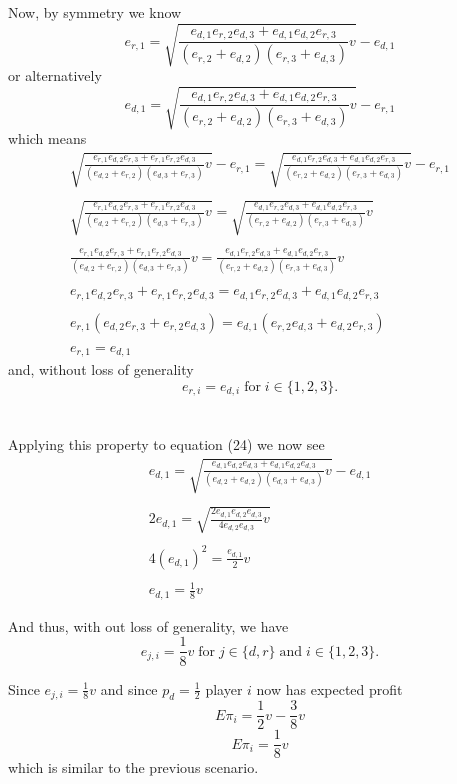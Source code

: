 \documentclass[a4paper,12pt]{article}
\begin{document}
\noindent Now, by symmetry we know
$$
e_{r,1} = \sqrt{\frac{e_{d,1}e_{r,2}e_{d,3} + e_{d,1}e_{d,2}e_{r,3}}{(e_{r,2}+e_{d,2})(e_{r,3}+e_{d,3})} v} - e_{d,1}
$$
or alternatively
$$
e_{d,1} = \sqrt{\frac{e_{d,1}e_{r,2}e_{d,3} + e_{d,1}e_{d,2}e_{r,3}}{(e_{r,2}+e_{d,2})(e_{r,3}+e_{d,3})} v} - e_{r,1}
$$
which means
\begin{gather*}
\sqrt{\frac{e_{r,1}e_{d,2}e_{r,3} + e_{r,1}e_{r,2}e_{d,3}}{(e_{d,2}+e_{r,2})(e_{d,3}+e_{r,3})} v} - e_{r,1} = \sqrt{\frac{e_{d,1}e_{r,2}e_{d,3} + e_{d,1}e_{d,2}e_{r,3}}{(e_{r,2}+e_{d,2})(e_{r,3}+e_{d,3})} v} - e_{r,1} \\ \\
\sqrt{\frac{e_{r,1}e_{d,2}e_{r,3} + e_{r,1}e_{r,2}e_{d,3}}{(e_{d,2}+e_{r,2})(e_{d,3}+e_{r,3})} v} = \sqrt{\frac{e_{d,1}e_{r,2}e_{d,3} + e_{d,1}e_{d,2}e_{r,3}}{(e_{r,2}+e_{d,2})(e_{r,3}+e_{d,3})} v}  \\ \\
\frac{e_{r,1}e_{d,2}e_{r,3} + e_{r,1}e_{r,2}e_{d,3}}{(e_{d,2}+e_{r,2})(e_{d,3}+e_{r,3})} v = \frac{e_{d,1}e_{r,2}e_{d,3} + e_{d,1}e_{d,2}e_{r,3}}{(e_{r,2}+e_{d,2})(e_{r,3}+e_{d,3})} v \\ \\
e_{r,1}e_{d,2}e_{r,3} + e_{r,1}e_{r,2}e_{d,3} = e_{d,1}e_{r,2}e_{d,3} + e_{d,1}e_{d,2}e_{r,3} \\ \\
e_{r,1}(e_{d,2}e_{r,3} + e_{r,2}e_{d,3}) = e_{d,1}(e_{r,2}e_{d,3} + e_{d,2}e_{r,3}) \\ \\
e_{r,1} = e_{d,1}
\end{gather*}
\noindent and, without loss of generality
$$
e_{r,i} = e_{d,i} \; \text{for} \; i \in \{1,2,3\}.
$$
\\ \\

Applying this property to equation (24) we now see
\begin{gather*}
e_{d,1} = \sqrt{\frac{e_{d,1}e_{d,2}e_{d,3} + e_{d,1}e_{d,2}e_{d,3}}{(e_{d,2}+e_{d,2})(e_{d,3}+e_{d,3})} v} - e_{d,1}  \\ \\
2 e_{d,1} = \sqrt{\frac{2 e_{d,1}e_{d,2}e_{d,3}}{4 e_{d,2}e_{d,3}} v} \\ \\
4(e_{d,1})^2 = \frac{e_{d,1}}{2} v \\ \\
e_{d,1} = \frac{1}{8}v
\end{gather*}

\noindent And thus, with out loss of generality, we have
$$
e_{j,i} = \frac{1}{8}v \; \text{for} \; j \in \{d,r \} \; \text{and} \; i \in \{1,2,3 \}.
$$

\noindent Since $ e_{j,i} = \frac{1}{8}v $ and since $p_d = \frac{1}{2}$ player $i$ now has expected profit
$$
E\pi_i = \frac{1}{2}v - \frac{3}{8}v
$$
$$
E\pi_i = \frac{1}{8}v
$$
\noindent which is similar to the previous scenario.
\end{document}
